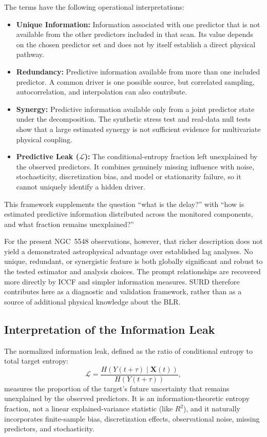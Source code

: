 \documentclass[fleqn,usenatbib]{mnras}
\begin{document}
The terms have the following operational interpretations:
\begin{itemize}
    \item \textbf{Unique Information:} Information associated with one predictor that is not available from the other predictors included in that scan. Its value depends on the chosen predictor set and does not by itself establish a direct physical pathway.
    \item \textbf{Redundancy:} Predictive information available from more than one included predictor. A common driver is one possible source, but correlated sampling, autocorrelation, and interpolation can also contribute.
    \item \textbf{Synergy:} Predictive information available only from a joint predictor state under the decomposition. The synthetic stress test and real-data null tests show that a large estimated synergy is not sufficient evidence for multivariate physical coupling.
    \item \textbf{Predictive Leak ($\mathcal{L}$):} The conditional-entropy fraction left unexplained by the observed predictors. It combines genuinely missing influence with noise, stochasticity, discretization bias, and model or stationarity failure, so it cannot uniquely identify a hidden driver.
\end{itemize}
This framework supplements the question ``what is the delay?'' with ``how is estimated predictive information distributed across the monitored components, and what fraction remains unexplained?''

For the present NGC~5548 observations, however, that richer description does not yield a demonstrated astrophysical advantage over established lag analyses. No unique, redundant, or synergistic feature is both globally significant and robust to the tested estimator and analysis choices. The prompt relationships are recovered more directly by ICCF and simpler information measures. SURD therefore contributes here as a diagnostic and validation framework, rather than as a source of additional physical knowledge about the BLR.

\subsection{Interpretation of the Information Leak}

The normalized information leak, defined as the ratio of conditional entropy to total target entropy:
\begin{equation}
\mathcal{L} = \frac{H(Y(t+\tau) \mid \mathbf{X}(t))}{H(Y(t+\tau))},
\end{equation}
measures the proportion of the target's future uncertainty that remains unexplained by the observed predictors. It is an information-theoretic entropy fraction, not a linear explained-variance statistic (like $R^2$), and it naturally incorporates finite-sample bias, discretization effects, observational noise, missing predictors, and stochasticity.
\end{document}
